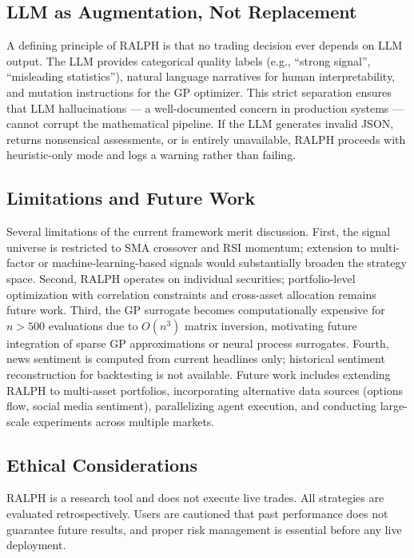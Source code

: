 \documentclass[conference]{IEEEtran}
\begin{document}
\subsection{LLM as Augmentation, Not Replacement}

A defining principle of RALPH is that no trading decision ever depends on LLM output. The LLM provides categorical quality labels (e.g., ``strong signal'', ``misleading statistics''), natural language narratives for human interpretability, and mutation instructions for the GP optimizer. This strict separation ensures that LLM hallucinations --- a well-documented concern in production systems --- cannot corrupt the mathematical pipeline. If the LLM generates invalid JSON, returns nonsensical assessments, or is entirely unavailable, RALPH proceeds with heuristic-only mode and logs a warning rather than failing.

\subsection{Limitations and Future Work}

Several limitations of the current framework merit discussion. First, the signal universe is restricted to SMA crossover and RSI momentum; extension to multi-factor or machine-learning-based signals would substantially broaden the strategy space. Second, RALPH operates on individual securities; portfolio-level optimization with correlation constraints and cross-asset allocation remains future work. Third, the GP surrogate becomes computationally expensive for $n > 500$ evaluations due to $O(n^3)$ matrix inversion, motivating future integration of sparse GP approximations or neural process surrogates. Fourth, news sentiment is computed from current headlines only; historical sentiment reconstruction for backtesting is not available. Future work includes extending RALPH to multi-asset portfolios, incorporating alternative data sources (options flow, social media sentiment), parallelizing agent execution, and conducting large-scale experiments across multiple markets.

\subsection{Ethical Considerations}

RALPH is a research tool and does not execute live trades. All strategies are evaluated retrospectively. Users are cautioned that past performance does not guarantee future results, and proper risk management is essential before any live deployment.
\end{document}

